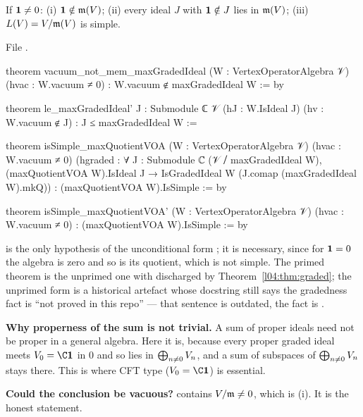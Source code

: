 \begin{theorem}\label{l04:thm:maxsimple}
If $\mathbf{1}\ne0$: (i) $\mathbf{1}\notin\mathfrak{m}(V)$; (ii) every ideal $J$ with $\mathbf{1}\notin J$
lies in $\mathfrak{m}(V)$; (iii) $L(V) = V/\mathfrak{m}(V)$ is simple.
\end{theorem}
\noindent File .
\begin{leancode}
theorem vacuum_not_mem_maxGradedIdeal (W : VertexOperatorAlgebra 𝒱) (hvac : W.vacuum ≠ 0) :
    W.vacuum ∉ maxGradedIdeal W := by

theorem le_maxGradedIdeal' {J : Submodule ℂ 𝒱} (hJ : W.IsIdeal J) (hv : W.vacuum ∉ J) :
    J ≤ maxGradedIdeal W :=

theorem isSimple_maxQuotientVOA (W : VertexOperatorAlgebra 𝒱) (hvac : W.vacuum ≠ 0)
    (hgraded : ∀ J : Submodule ℂ (𝒱 ⧸ maxGradedIdeal W), (maxQuotientVOA W).IsIdeal J →
      IsGradedIdeal W (J.comap (maxGradedIdeal W).mkQ)) :
    (maxQuotientVOA W).IsSimple := by

theorem isSimple_maxQuotientVOA' (W : VertexOperatorAlgebra 𝒱) (hvac : W.vacuum ≠ 0) :
    (maxQuotientVOA W).IsSimple := by
\end{leancode}
\begin{dictionary}
 is the only hypothesis of the unconditional form
\allowbreak{}; it is necessary, since for $\mathbf{1} = 0$ the algebra is zero and
so is its quotient, which is not simple. The primed theorem is the unprimed one with 
discharged by Theorem~\ref{l04:thm:graded}; the unprimed form is a historical artefact whose docstring
still says the gradedness fact is ``not proved in this repo'' --- that sentence is outdated, the
fact is \allowbreak{}\allowbreak{}.

\textbf{Why properness of the sum is not trivial.} A sum of proper ideals need not be proper in a
general algebra. Here it is, because every proper graded ideal meets $\lfourV_0 = \C\lfourvac$ in $0$ and
so lies in $\bigoplus_{n\ne0}V_n$, and a sum of subspaces of $\bigoplus_{n\ne0}V_n$
stays there. This is where CFT type ($\lfourV_0 = \C\lfourvac$) is essential.

\textbf{Could the conclusion be vacuous?}  contains $V/\mathfrak{m}\ne0$, which is
(i). It is the honest statement.
\end{dictionary}
